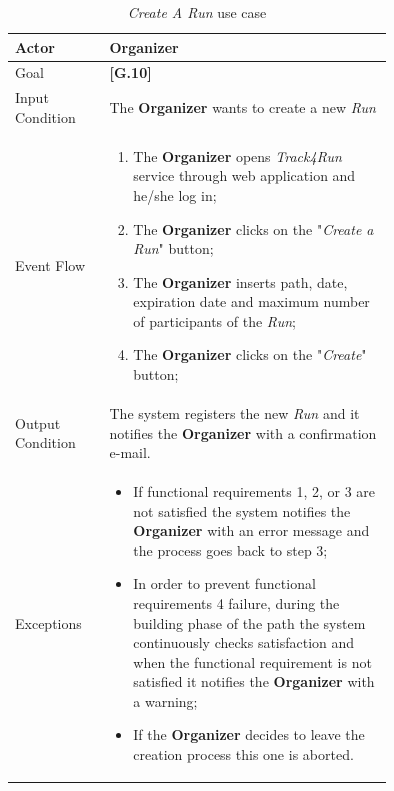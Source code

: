 \begin{center}
\begin{table}
\begin{tabular}{ | l | p{0.75\linewidth} | }
  \hline
    Actor & \textbf{Organizer} \\ \hline
    Goal & \textbf{[G.10]} \\ \hline
    Input Condition & The \textbf{Organizer} wants to create a new \textit{Run} \\ \hline
    Event Flow & \begin{minipage}[t]{0.7\textwidth}
      \begin{enumerate}
        \item The \textbf{Organizer} opens \textit{Track4Run} service through web application and he/she log in;
        \item The \textbf{Organizer} clicks on the "\textit{Create a Run}" button;
        \item The \textbf{Organizer} inserts path, date, expiration date and maximum number of participants of the \textit{Run};
        \item The \textbf{Organizer} clicks on the "\textit{Create}" button;
      \end{enumerate}
    \smallskip
  \end{minipage} \\ \hline
  Output Condition & The system registers the new \textit{Run} and it notifies the \textbf{Organizer} with a confirmation e-mail. \\ \hline
  Exceptions & \begin{minipage}[t]{0.7\textwidth}
    \begin{itemize}
      \smallskip
      \item If functional requirements 1, 2, or 3 are not satisfied the system notifies the \textbf{Organizer} with an error message and the process goes back to step 3;
      \item In order to prevent functional requirements 4 failure, during the building phase of the path the system continuously checks satisfaction and when the functional requirement is not satisfied it notifies the \textbf{Organizer} with a warning;
      \item If the \textbf{Organizer} decides to leave the creation process this one is aborted.
    \end{itemize}
    \smallskip
  \end{minipage}  \\ \hline
\end{tabular}
\caption{\textit{Create A Run} use case}
\label{table:createRunTable}
\end{table}
\end{center}

